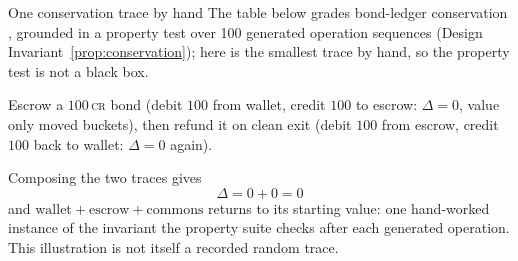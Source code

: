 \documentclass[11pt,a4paper]{article}
\theoremstyle{definition}
\theoremstyle{definition}
\theoremstyle{remark}
\begin{document}
\begin{pdexample}{One conservation trace by hand}
\setlength{\parskip}{4pt plus 1pt}
The table below grades bond-ledger conservation \Built{}, grounded in a
property test over 100 generated operation sequences
(Design Invariant~\ref{prop:conservation}); here is the smallest trace by hand,
so the property test is not a black box.

Escrow a $100$\,\textsc{cr} bond
(debit $100$ from wallet, credit $100$ to escrow: $\Delta=0$, value only moved
buckets), then refund it on clean exit (debit $100$ from escrow, credit $100$
back to wallet: $\Delta=0$ again).

Composing the two traces gives
\[
\Delta=0+0=0
\] and $\text{wallet}+\text{escrow}+\text{commons}$ returns to
its starting value: one hand-worked instance of the invariant the property suite checks after
each generated operation. This illustration is not itself a recorded random
trace.
\end{pdexample}
\end{document}
